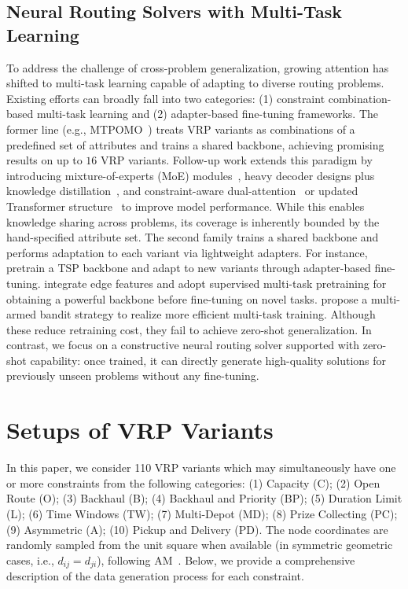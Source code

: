 \documentclass{article}
\theoremstyle{plain}
\theoremstyle{definition}
\theoremstyle{remark}
\begin{document}
\subsection{Neural Routing Solvers with Multi-Task Learning}
To address the challenge of cross-problem generalization, growing attention has shifted to multi-task learning capable of adapting to diverse routing problems. Existing efforts can broadly fall into two categories: (1) constraint combination-based multi-task learning and (2) adapter-based fine-tuning frameworks. The former line (e.g., MTPOMO~\citep{liu2024mtpomo}) treats VRP variants as combinations of a predefined set of attributes and trains a shared backbone, achieving promising results on up to $16$ VRP variants. Follow-up work extends this paradigm by introducing mixture-of-experts (MoE) modules~\citep{zhou2024mvmoe}, heavy decoder designs plus knowledge distillation~\citep{zheng2025mtl_kd}, and constraint-aware dual-attention~\citep{li2025cada} or updated Transformer structure~\citep{berto2024routefinder} to improve model performance. While this enables knowledge sharing across problems, its coverage is inherently bounded by the hand-specified attribute set. The second family trains a shared backbone and performs adaptation to each variant via lightweight adapters. For instance, \citet{lin2024cross} pretrain a TSP backbone and adapt to new variants through adapter-based fine-tuning. \citet{drakulic2025goal} integrate edge features and adopt supervised multi-task pretraining for obtaining a powerful backbone before fine-tuning on novel tasks. \citet{wang2025mtl_mab} propose a multi-armed bandit strategy to realize more efficient multi-task training. Although these reduce retraining cost, they fail to achieve zero-shot generalization. In contrast, we focus on a constructive neural routing solver supported with zero-shot capability: once trained, it can directly generate high-quality solutions for previously unseen problems without any fine-tuning.

\clearpage
\section{Setups of VRP Variants}
\label{append:setup_constraints}
In this paper, we consider 110 VRP variants which may simultaneously have one or more constraints from the following categories: (1) Capacity (C); (2) Open Route (O); (3) Backhaul (B); (4) Backhaul and Priority (BP); (5) Duration Limit (L); (6) Time Windows (TW); (7) Multi-Depot (MD); (8) Prize Collecting (PC); (9) Asymmetric (A); (10) Pickup and Delivery (PD). The node coordinates are randomly sampled from the unit square when available (in symmetric geometric cases, i.e., $d_{ij}=d_{ji}$), following AM~\citep{kool2019attention}. Below, we provide a comprehensive description of the data generation process for each constraint.
\end{document}
